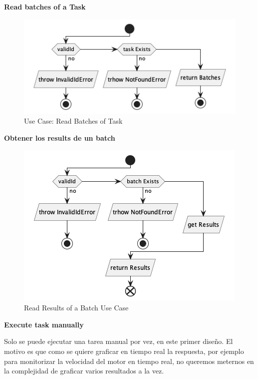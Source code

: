 \textbf{Read batches of a Task}

\begin{figure}[H]
    \centering
    \includegraphics[height=0.2\textheight]{./part/Proyecto_ejecutivo/memoria_descriptiva/descripcionDelProyecto/manager/uml/getTaskBatchUseCase}
    \caption{Use Case: Read Batches of Task}\label{fig:Use Case-Read Batches of Task}
\end{figure}

\textbf{Obtener los results de un batch}

\begin{figure}[H]
    \centering
    \includegraphics[height=0.2\textheight]{./part/Proyecto_ejecutivo/memoria_descriptiva/descripcionDelProyecto/manager/uml/getBatchResultsUseCase}
    \caption{Read Results of a Batch Use Case}\label{fig:Read Results of a Batch Use Case}
\end{figure}

\textbf{Execute task manually}

Solo se puede ejecutar una tarea manual por vez, en este primer diseño. El motivo es que como se quiere graficar en tiempo real la respuesta, por ejemplo para monitorizar la velocidad del motor en tiempo real, no queremos meternos en la complejidad de graficar varios resultados a la vez.

